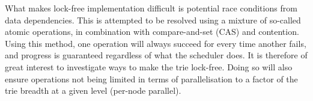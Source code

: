 What makes lock-free implementation difficult is potential race conditions from
data dependencies. This is attempted to be resolved using a
mixture of so-called atomic operations, in combination with compare-and-set
(CAS) and contention. Using this method, one operation will always succeed
for every time another fails, and progress is guaranteed regardless of
    what the scheduler does.\cite{Shavit:2011} It is therefore of great interest
    to investigate ways to make the trie lock-free.
Doing so will also ensure operations not being limited in terms of parallelisation
to a factor of the trie breadth at a given level (per-node parallel).
